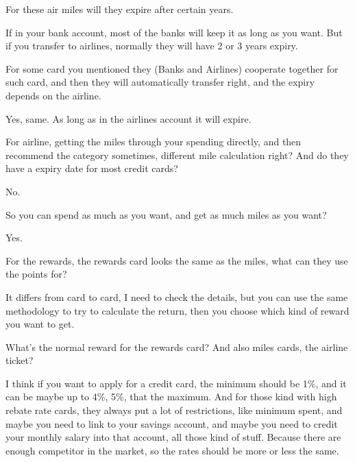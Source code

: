 \begin{description}[leftmargin=4em,style=nextline]
	\item[JH:] For these air miles will they expire after certain years.

	\item[HJ:] If in your bank account, most of the banks will keep it as long as you want. But if you transfer to airlines, normally they will have 2 or 3 years expiry.

	\item[JH:] For some card you mentioned they (Banks and Airlines) cooperate together  for such card, and then they will automatically transfer right, and the expiry depends on the airline.

	\item[HJ:] Yes, same. As long as in the airlines account it will expire.

	\item[JH:] For airline, getting the miles through your spending directly, and then recommend the category sometimes, different mile calculation right? And do they have a expiry date for most credit cards?

	\item[HJ:] No.

	\item[JH:] So you can spend as much as you want, and get as much miles as you want?

	\item[HJ:] Yes.

	\item[JH:] For the rewards, the rewards card looks the same as the miles, what can they use the points for?

	\item[HJ:] It differs from card to card, I need to check the details, but you can use the same methodology to try to calculate the return, then you choose which kind of reward you want to get.

	\item[JH:] What’s the normal reward for the rewards card? And also miles cards, the airline ticket?

	\item[HJ:] I think if you want to apply for a credit card, the minimum should be 1\%, and it can be maybe up to 4\%, 5\%, that the maximum. And for those kind with high rebate rate cards, they always put a lot of restrictions, like minimum spent, and maybe you need to link to your savings account, and maybe you need to credit your monthly salary into that account, all those kind of stuff. Because there are enough competitor in the market, so the rates should be more or less the same.


\end{description}
